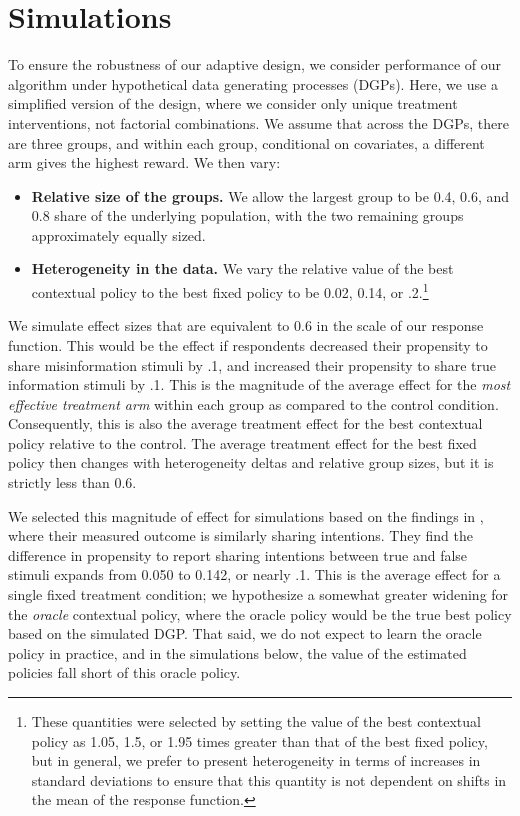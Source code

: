 \documentclass[letterpaper, 12pt, parskip=full,DIV=10]{scrartcl}
\begin{document}
\section{Simulations}
To ensure the robustness of our adaptive design, we consider performance of our algorithm under hypothetical data generating processes (DGPs). Here, we use a simplified version of the design, where we consider only unique treatment interventions, not factorial combinations. We assume that across the DGPs, there are three groups, and within each group, conditional on covariates, a different arm gives the highest reward. We then vary:
\begin{itemize}
\item \textbf{Relative size of the groups.} We allow the largest group to be 0.4, 0.6, and 0.8 share of the underlying population, with the two remaining groups approximately equally sized.
\item \textbf{Heterogeneity in the data.} We vary the relative value of the best contextual policy to the best fixed policy to be 0.02, 0.14, or .2.\footnote{These quantities were selected by setting the value of the best contextual policy as 1.05, 1.5, or 1.95 times greater than that of the best fixed policy, but in general, we prefer to present heterogeneity in terms of increases in standard deviations to ensure that this quantity is not dependent on shifts in the mean of the response function.} 
\end{itemize}

We simulate effect sizes that are equivalent to 0.6 in the scale of our response function. This would be the effect if respondents decreased their propensity to share misinformation stimuli by .1, and increased their propensity to share true information stimuli by .1. This is the magnitude of the average effect for the \textit{most effective treatment arm} within each group as compared to the control condition. Consequently, this is also the average treatment effect for the best contextual policy relative to the control. The average treatment effect for the best fixed policy then changes with heterogeneity deltas and relative group sizes, but it is strictly less than 0.6. 

We selected this magnitude of effect for simulations based on the findings in \cite{pennycook2020fighting}, where their measured outcome is similarly sharing intentions. They find the difference in propensity to report sharing intentions between true and false stimuli expands from 0.050 to 0.142, or nearly .1. This is the average effect for a single fixed treatment condition; we hypothesize a somewhat greater widening for the \textit{oracle} contextual policy, where the oracle policy would be the true best policy based on the simulated DGP. That said, we do not expect to learn the oracle policy in practice, and in the simulations below, the value of the estimated policies fall short of this oracle policy. 
\end{document}
